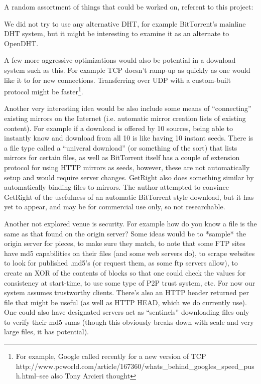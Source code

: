 A random assortment of things that could be worked on, referent to this project:


We did not try to use any alternative DHT, for example BitTorrent's mainline DHT system, but it might be interesting to examine it as an alternate to OpenDHT.

A few more aggressive optimizations would also be potential in a download system such as this.  For example TCP doesn't ramp-up as quickly as one would like it to for new connections.  Transferring over UDP with a custom-built protocol might be faster\footnote{For example, Google called recently for a new version of TCP http://www.pcworld.com/article/167360/whats\_behind\_googles\_speed\_push.html--see also Tony Arcieri thought}.  

Another very interesting idea would be also include some means of ``connecting'' existing mirrors on the Internet (i.e. automatic mirror creation lists of existing content).  For example if a download is offered by 10 sources, being able to instantly know and download from all 10 is like having 10 instant seeds.  There is a file type called a ``univeral download'' (or something of the sort) that lists mirrors for certain files, as well as BitTorrent itself has a couple of extension protocol for using HTTP mirrors as seeds, however, these are not automatically setup and would require server changes.  GetRight also does something similar by automatically binding files to mirrors.  The author attempted to convince GetRight of the usefulness of an automatic BitTorrent style download, but it has yet to appear, and may be for commercial use only, so not researchable.


Another not explored venue is security.  For example how do you know a file is the same as that found on the origin server?  Some ideas would be to *sample* the origin server for pieces, to make sure they match, to note that some FTP sites have md5 capabilities on their files (and some web servers do), to scrape websites to look for published .md5's (or request them, as some ftp servers allow), to create an XOR of the contents of blocks so that one could check the values for consistency at start-time, to use some type of P2P trust system, etc. For now our system assumes trustworthy clients.  There's also an HTTP header returned per file that might be useful (as well as HTTP HEAD, which we do currently use).  One could also have designated servers act as ``sentinels'' downloading files only to verify their md5 sums (though this obviously breaks down with scale and very large files, it has potential).


